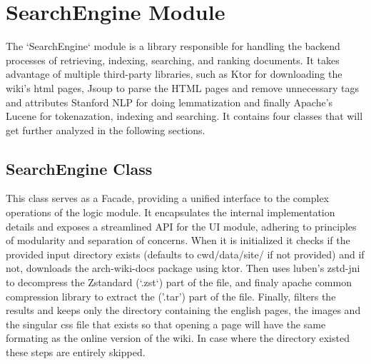 \documentclass[conference]{IEEEtran}
\begin{document}
    \section{SearchEngine Module}{
        The `SearchEngine` module is a library responsible for handling the backend processes of retrieving, indexing, searching, and ranking documents.
        It takes advantage of multiple third-party libraries, such as Ktor for downloading the wiki’s html pages,
        Jsoup to parse the HTML pages and remove unnecessary tags and attributes
        Stanford NLP for doing lemmatization
        and finally Apache's Lucene for tokenazation, indexing and searching.
        It contains four classes that will get further analyzed in the following sections.


        \subsection{\textbf{SearchEngine Class}}{This class serves as a Facade, providing a unified interface to the complex operations of the logic module.
        It encapsulates the internal implementation details and exposes a streamlined API for the UI module, adhering to principles of modularity and separation of concerns.
        When it is initialized it checks if the provided input directory exists (defaults to cwd/data/site/ if not provided) and if not, downloads the arch-wiki-docs package using ktor.
        Then uses luben's zstd-jni to decompress the Zstandard (`.zst`) part of the file, and finaly apache common compression library to extract the ('.tar') part of the file.
        Finally, filters the results and keeps only the directory containing the english pages, the images and the singular css file that exists so that opening a page will have the same formating as the online version of the wiki.
        In case where the directory existed these steps are entirely skipped.

        }\label{searchengine-class}

}
\end{document}
